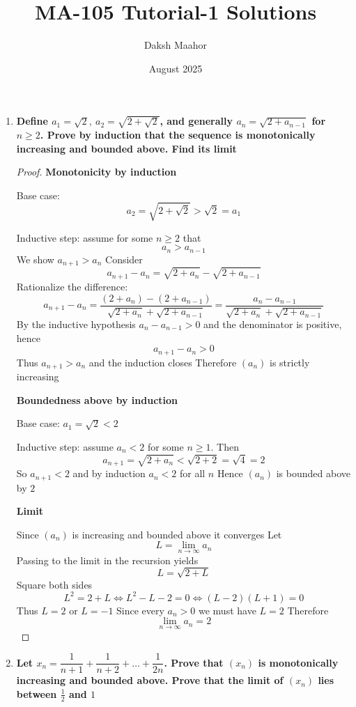 \documentclass[14pt]{extarticle}
\title{\vspace{-3cm}MA-105 Tutorial-1 Solutions}
\author{Daksh Maahor}
\date{August 2025}
\begin{document}
\maketitle

\bigskip

\begin{enumerate}

\item \textbf{Define $a_1=\sqrt{2},\ a_2=\sqrt{2+\sqrt{2}}$, and generally $a_n=\sqrt{2+a_{n-1}}$ for $n\ge 2$. Prove by induction that the sequence is monotonically increasing and bounded above. Find its limit}

\begin{proof}
\textbf{Monotonicity by induction}  

Base case:  
\[
a_2=\sqrt{2+\sqrt{2}}>\sqrt{2}=a_1
\]

Inductive step: assume for some $n\ge2$ that
\[
a_n>a_{n-1}
\]
We show $a_{n+1}>a_n$ Consider
\[
a_{n+1}-a_n=\sqrt{2+a_n}-\sqrt{2+a_{n-1}}
\]
Rationalize the difference:
\[
a_{n+1}-a_n=\frac{(2+a_n)-(2+a_{n-1})}{\sqrt{2+a_n}+\sqrt{2+a_{n-1}}}
=\frac{a_n-a_{n-1}}{\sqrt{2+a_n}+\sqrt{2+a_{n-1}}}
\]
By the inductive hypothesis $a_n-a_{n-1}>0$ and the denominator is positive, hence
\[
a_{n+1}-a_n>0
\]
Thus $a_{n+1}>a_n$ and the induction closes Therefore $(a_n)$ is strictly increasing

\medskip
\textbf{Boundedness above by induction}  

Base case: $a_1=\sqrt{2}<2$  

Inductive step: assume $a_n<2$ for some $n\ge1$. Then
\[
a_{n+1}=\sqrt{2+a_n}<\sqrt{2+2}=\sqrt{4}=2
\]
So $a_{n+1}<2$ and by induction $a_n<2$ for all $n$ Hence $(a_n)$ is bounded above by $2$

\medskip
\textbf{Limit}  

Since $(a_n)$ is increasing and bounded above it converges Let
\[
L=\lim_{n\to\infty}a_n
\]
Passing to the limit in the recursion yields
\[
L=\sqrt{2+L}
\]
Square both sides
\[
L^2=2+L \iff L^2-L-2=0 \iff (L-2)(L+1)=0
\]
Thus $L=2$ or $L=-1$ Since every $a_n>0$ we must have $L=2$ Therefore
\[
\boxed{\lim_{n\to\infty}a_n=2}
\]
\end{proof}

\newpage
\item \textbf{Let $x_n=\dfrac{1}{n+1}+\dfrac{1}{n+2}+\dots+\dfrac{1}{2n}$. Prove that $(x_n)$ is monotonically increasing and bounded above. Prove that the limit of $(x_n)$ lies between $\tfrac12$ and $1$}


\end{enumerate}
\end{document}

